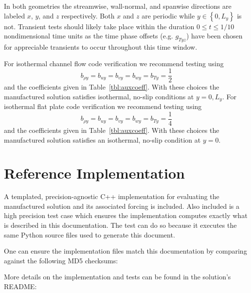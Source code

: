 \documentclass[10pt,reqno]{amsart}
\begin{document}
In both geometries the streamwise, wall-normal, and spanwise directions are
labeled $x$, $y$, and $z$ respectively.  Both $x$ and $z$ are periodic while
$y\in\left\{0,L_y\right\}$ is not.  Transient tests should likely take place
within the duration $0\leq{}t\leq{}1/10$ nondimensional time units as the time
phase offsets (e.g. $g_{Tyz}$) have been chosen for appreciable transients to
occur throughout this time window.

For isothermal channel flow code verification we recommend testing using
\begin{equation*}
  b_{\rho{}y} =
  b_{u{}y}    =
  b_{v{}y}    =
  b_{w{}y}    =
  b_{T{}y}    = \frac{1}{2}
\end{equation*}
and the coefficients given in Table~\ref{tbl:auxcoeff}.  With these choices
the manufactured solution satisfies isothermal, no-slip conditions at $y = 0,
L_y$.  For isothermal flat plate code verification we recommend testing using
\begin{equation*}
  b_{\rho{}y} =
  b_{u{}y}    =
  b_{v{}y}    =
  b_{w{}y}    =
  b_{T{}y}    = \frac{1}{4}
\end{equation*}
and the coefficients given in Table~\ref{tbl:auxcoeff}.  With these choices
the manufactured solution satisfies an isothermal, no-slip condition at $y =
0$.

\section{Reference Implementation}

A templated, precision-agnostic C++ implementation for evaluating the
manufactured solution and its associated forcing is included.  Also included is
a high precision test case which ensures the implementation computes exactly
what is described in this documentation.  The test can do so because it
executes the same Python source files used to generate this document.

One can ensure the implementation files match this documentation by comparing
against the following MD5 checksums:



More details on the implementation and tests can be found in the solution's
README:


\end{document}
